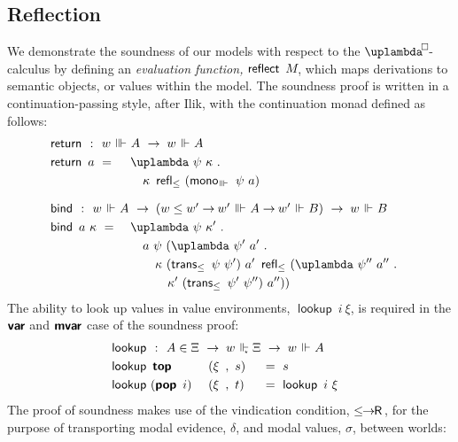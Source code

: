 \documentclass[submission,copyright,creativecommons,sharealike,backref=page]{eptcs}
\newcommand{\uplambdabox}{\uplambda^{\mkern-3mu\Box\mkern-3mu}}
\newcommand{\R}{\mathrel{\rlap{$\mkern.75mu\textsf{R}$}\hphantom{\subseteq}}}
\renewcommand{\:}{\mathop{\mkern3mu:\mkern3mu}}
\renewcommand{\.}{\mathop{\mkern3mu.\mkern3mu}}
\renewcommand{\;}{\mathop{;}}
\renewcommand{\,}{\mathop{,}}
\newcommand{\ee}{\mathrel{\mkern2mu\Vdash\mkern1mu}}
\newcommand{\ees}{\mathrel{\mkern2mu\Vdash_{\mkern-9mu\scriptscriptstyle{\star}}}}
\newcommand{\eee}{\mathrel{\mkern2mu\Vvdash\mkern1mu}}
\renewcommand{\r}{\mathrel{\rightarrow\mkern-1mu}}
\newcommand{\reflect}{\operatorname{\textsf{reflect}}}
\newcommand{\monoeee}{\operatorname{\textsf{mono}_{\eee}}}
\newcommand{\reflle}{\operatorname{\textsf{refl}_{\le}}}
\newcommand{\transle}{\operatorname{\textsf{trans}_{\le}}}
\newcommand{\lerR}{\operatorname{\le\mkern-1mu\r\mkern-1mu\R}}
\newcommand{\var}{\operatorname{\textsf{\textbf{var}}}}
\newcommand{\mvar}{\operatorname{\textsf{\textbf{mvar}}}}
\newcommand{\tops}{\operatorname{\textsf{\textbf{top}}}}
\newcommand{\pops}{\operatorname{\textsf{\textbf{pop}}}}
\newcommand{\return}{\operatorname{\textsf{return}}}
\newcommand{\bind}{\operatorname{\textsf{bind}}}
\newcommand{\lookup}{\operatorname{\textsf{lookup}}}
\theoremstyle{mystyle}
\begin{document}
\subsection{Reflection}

We demonstrate the soundness of our models with respect to the $\uplambdabox$-calculus by defining an \emph{evaluation function,} $\reflect~M\mkern-3mu$, which maps derivations to semantic objects, or values within the model.  The soundness proof is written in a continuation-passing style, after Ilik, with the continuation monad defined as follows:
\begin{alignat*}{3}
  & \return ~\:~ \rlap{$w \eee A ~\r~ w \ee A$}\\
  & \return~a      ~=~ && \uplambda~\psi~\kappa \.\\
  &                    && \quad \kappa~\reflle~(\monoeee~\psi~a)\\[.5\baselineskip]
  & \bind ~\:~ \rlap{$w \ee A ~\r~ (w \le w' \r w' \eee A \r w' \ee B) ~\r~ w \ee B$}\\
  & \bind~a~\kappa ~=~ && \uplambda~\psi~\kappa' \.\\
  &                    && \quad a~\psi~(\uplambda~\psi'~a' \.\\
  &                    && \quad\quad \kappa~(\transle~\psi~\psi')~a'~\reflle~(\uplambda~\psi''~a'' \.\\
  &                    && \quad\quad\quad \kappa'~(\transle~\psi'~\psi'')~a''))
\end{alignat*}
The ability to look up values in value environments, $\lookup~i~\xi$, is required in the $\var$ and $\mvar$ case of the soundness proof:
\begin{alignat*}{3}
  & \lookup ~\:~ \rlap{$A \in \Xi ~\r~ w \ees \Xi ~\r~ w \ee A$}\\
  & \lookup~\tops     && ~(\xi~\,~s) && ~=~ s\\
  & \lookup~(\pops~i) && ~(\xi~\,~t) && ~=~ \lookup~i~\xi
\end{alignat*}
The proof of soundness makes use of the vindication condition, $\lerR$, for the purpose of transporting modal evidence, $\delta$, and modal values, $\sigma$, between worlds:
\end{document}
